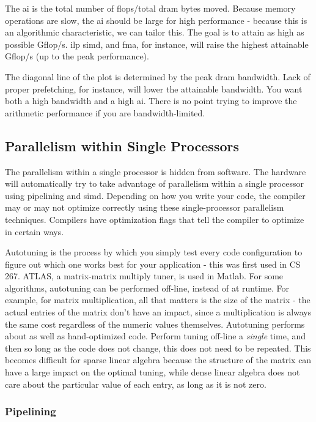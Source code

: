 \documentclass[10pt]{article}
\begin{document}
\begin{flushleft}
The \gls{ai} is the total number of flops/total \gls{dram} bytes moved. Because memory operations are slow, the \gls{ai} should be large for high performance - because this is an algorithmic characteristic, we can tailor this. The goal is to attain as high as possible Gflop/s. \gls{ilp} \gls{simd}, and \gls{fma}, for instance, will raise the highest attainable Gflop/s (up to the peak performance). 

The diagonal line of the plot is determined by the peak \gls{dram} bandwidth. Lack of proper prefetching, for instance, will lower the attainable bandwidth. You want both a high bandwidth and a high \gls{ai}. There is no point trying to improve the arithmetic performance if you are bandwidth-limited.

\subsection{Parallelism within Single Processors}

The parallelism within a single processor is hidden from software. The hardware will automatically try to take advantage of parallelism within a single processor using pipelining and \gls{simd}. Depending on how you write your code, the compiler may or may not optimize correctly using these single-processor parallelism techniques. Compilers have optimization flags that tell the compiler to optimize in certain ways. 

Autotuning is the process by which you simply test every code configuration to figure out which one works best for your application - this was first used in CS 267. ATLAS, a matrix-matrix multiply tuner, is used in Matlab. For some algorithms, autotuning can be performed off-line, instead of at runtime. For example, for matrix multiplication, all that matters is the size of the matrix - the actual entries of the matrix don't have an impact, since a multiplication is always the same cost regardless of the numeric values themselves. Autotuning performs about as well as hand-optimized code. Perform tuning off-line a \textit{single} time, and then so long as the code does not change, this does not need to be repeated. This becomes difficult for sparse linear algebra because the structure of the matrix can have a large impact on the optimal tuning, while dense linear algebra does not care about the particular value of each entry, as long as it is not zero.

\subsubsection{Pipelining}


\end{flushleft}
\end{document}

